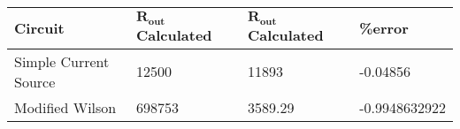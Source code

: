  \begin{tabular}[H]{| l | l | l | l |}
\hline

\textbf{Circuit}  & $\mathbf{R_{out}}$ \textbf{Calculated} & $\mathbf{R_{out}}$ \textbf{Calculated} &  \textbf{\%error} \\ \hline 
Simple Current Source & 12500 & 11893 &  -0.04856 \\ \hline 
Modified Wilson & 698753 & 3589.29 &  -0.9948632922 \\ \hline 
\end{tabular}
